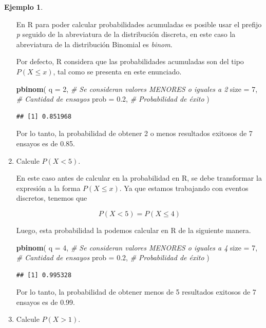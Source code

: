 \documentclass[
  11pt,
]{book}
\newenvironment{Shaded}{\begin{snugshade}}{\end{snugshade}}
\newcommand{\AttributeTok}[1]{\textcolor[rgb]{0.13,0.29,0.53}{#1}}
\newcommand{\CommentTok}[1]{\textcolor[rgb]{0.56,0.35,0.01}{\textit{#1}}}
\newcommand{\DecValTok}[1]{\textcolor[rgb]{0.00,0.00,0.81}{#1}}
\newcommand{\FloatTok}[1]{\textcolor[rgb]{0.00,0.00,0.81}{#1}}
\newcommand{\FunctionTok}[1]{\textcolor[rgb]{0.13,0.29,0.53}{\textbf{#1}}}
\newcommand{\NormalTok}[1]{#1}
\theoremstyle{definition}
\theoremstyle{definition}
\newtheorem{example}{Ejemplo}[chapter]
\theoremstyle{definition}
\theoremstyle{definition}
\theoremstyle{remark}
\begin{document}
\begin{example}
\begin{enumerate}
  En R para poder calcular probabilidades acumuladas es posible usar el prefijo \emph{p} seguido de la abreviatura de la distribución discreta, en este caso la abreviatura de la distribución Binomial es \emph{binom}.

  Por defecto, R considera que las probabilidades acumuladas son del tipo \(P(X \leq x)\), tal como se presenta en este enunciado.

\begin{Shaded}
\begin{Highlighting}[]
\FunctionTok{pbinom}\NormalTok{(}
  \AttributeTok{q =} \DecValTok{2}\NormalTok{, }\CommentTok{\# Se consideran valores MENORES o iguales a 2}
  \AttributeTok{size =} \DecValTok{7}\NormalTok{, }\CommentTok{\# Cantidad de ensayos}
  \AttributeTok{prob =} \FloatTok{0.2}\NormalTok{, }\CommentTok{\# Probabilidad de éxito}
\NormalTok{)}
\end{Highlighting}
\end{Shaded}

\begin{verbatim}
## [1] 0.851968
\end{verbatim}

  Por lo tanto, la probabilidad de obtener 2 o menos resultados exitosos de 7 ensayos es de 0.85.
\item
  Calcule \(P(X < 5)\).

  En este caso antes de calcular en la probabilidad en R, se debe transformar la expresión a la forma \(P(X \leq x)\). Ya que estamos trabajando con eventos discretos, tenemos que

  \[P(X < 5) = P(X \leq 4)\]

  Luego, esta probabilidad la podemos calcular en R de la siguiente manera.

\begin{Shaded}
\begin{Highlighting}[]
\FunctionTok{pbinom}\NormalTok{(}
  \AttributeTok{q =} \DecValTok{4}\NormalTok{, }\CommentTok{\# Se consideran valores MENORES o iguales a 4}
  \AttributeTok{size =} \DecValTok{7}\NormalTok{, }\CommentTok{\# Cantidad de ensayos}
  \AttributeTok{prob =} \FloatTok{0.2}\NormalTok{, }\CommentTok{\# Probabilidad de éxito}
\NormalTok{)}
\end{Highlighting}
\end{Shaded}

\begin{verbatim}
## [1] 0.995328
\end{verbatim}

  Por lo tanto, la probabilidad de obtener menos de 5 resultados exitosos de 7 ensayos es de 0.99.
\item
  Calcule \(P(X > 1)\).


\end{enumerate}
\end{example}
\end{document}
